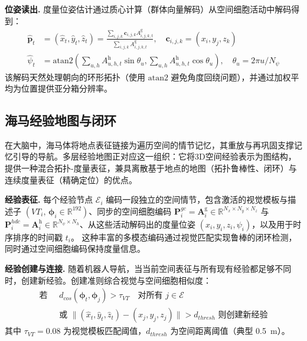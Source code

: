\textbf{位姿读出.} 度量位姿估计通过质心计算（群体向量解码）从空间细胞活动中解码得到：
\begin{align}
    \hat{\mathbf{p}}_t & = ({\hat x}_t, {\hat y}_t, {\hat z}_t) = \frac{\sum_{i,j,k} \mathbf{c}_{i,j,k} A^\mathrm{g}_{i,j,k,t}}{\sum_{i,j,k} A^\mathrm{g}_{i,j,k,t}}, \quad \mathbf{c}_{i,j,k} = (x_i, y_j, z_k) \\
    \hat{\psi}_t       & = \mathrm{atan2}\left(\sum_{u,h} A^\mathrm{h}_{u,h,t} \sin\theta_u, \sum_{u,h} A^\mathrm{h}_{u,h,t} \cos\theta_u\right), \quad \theta_u = 2\pi u / N_\psi
\end{align}
该解码天然处理朝向的环形拓扑（使用 $\mathrm{atan2}$ 避免角度回绕问题），并通过加权平均为位置提供亚分箱分辨率。

\subsection{海马经验地图与闭环}
\label{sec:loop_closure}

在大脑中，海马体将地点表征链接为遍历空间的情节记忆，其重放与再巩固支撑记忆引导的导航。多层经验地图正对应这一组织：它将3D空间经验表示为图结构，提供一种混合拓扑-度量表征，兼具离散基于地点的地图（拓扑鲁棒性、闭环）与连续度量表征（精确定位）的优点。

\textbf{经验表征.} 每个经验节点 $\mathcal{E}_i$ 编码一段独立的空间情节，包含激活的视觉模板与描述子 $(VT_i,\,\boldsymbol{\phi}_i\in\mathbb{R}^{192})$、同步的空间细胞编码 $\mathbf{P}^{gc}_i=\mathbf{A}^\mathrm{g}_i\in\mathbb{R}^{N_x\times N_y\times N_z}$ 与 $\mathbf{P}^{hdc}_i=\mathbf{A}^\mathrm{h}_i\in\mathbb{R}^{N_\psi\times N_h}$、从这些活动解码出的度量位姿 $(x_i, y_i, z_i, \psi_i)$，以及用于时序排序的时间戳 $t_i$。
这种丰富的多模态编码通过视觉匹配实现鲁棒的闭环检测，同时通过空间细胞编码保持度量信息。

\textbf{经验创建与连接.} 随着机器人导航，当当前空间表征与所有现有经验都足够不同时，创建新经验。创建准则综合视觉与空间细胞相似度：
\begin{equation}
    \begin{aligned}
        \text{若 }\; & d_{cos}(\boldsymbol{\phi}_t, \boldsymbol{\phi}_j) > \tau_{VT} \quad \text{对所有 } j \in \mathcal{E} \\
                                           & \text{或 } \lVert (\hat{x}_t, \hat{y}_t, \hat{z}_t) - (x_j, y_j, z_j) \rVert > d_{thresh} \text{ 则创建新经验}
    \end{aligned}
\end{equation}
其中 $\tau_{VT} = 0.08$ 为视觉模板匹配阈值，$d_{thresh}$ 为空间距离阈值（典型 0.5~m）。

